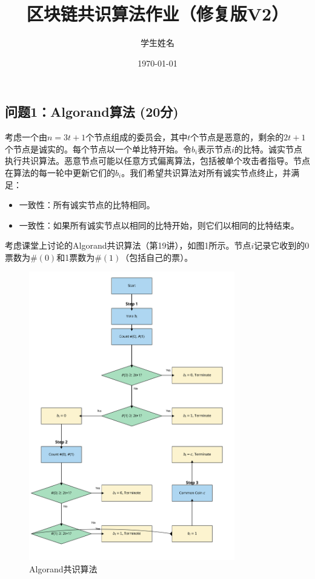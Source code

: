 \documentclass[12pt,a4paper]{article}
\title{区块链共识算法作业（修复版V2）}
\author{学生姓名}
\date{\today}
\begin{document}
\begin{CJK}{UTF8}{gbsn}

\maketitle

\section{问题1：Algorand算法 (20分)}

考虑一个由$n = 3t + 1$个节点组成的委员会，其中$t$个节点是恶意的，剩余的$2t + 1$个节点是诚实的。每个节点以一个单比特开始。令$b_i$表示节点$i$的比特。诚实节点执行共识算法。恶意节点可能以任意方式偏离算法，包括被单个攻击者指导。节点在算法的每一轮中更新它们的$b_i$。我们希望共识算法对所有诚实节点终止，并满足：

\begin{itemize}
    \item 一致性：所有诚实节点的比特相同。
    \item 一致性：如果所有诚实节点以相同的比特开始，则它们以相同的比特结束。
\end{itemize}

考虑课堂上讨论的Algorand共识算法（第19讲），如图1所示。节点$i$记录它收到的0票数为$\#(0)$和1票数为$\#(1)$（包括自己的票）。

\begin{figure}[h]
    \centering
    \includegraphics[width=0.8\textwidth]{images/algorand_algorithm_improved.png}
    \caption{Algorand共识算法}
\end{figure}


\end{CJK}
\end{document}
